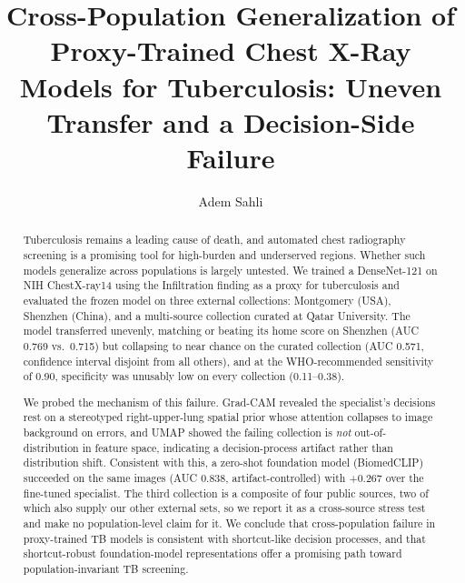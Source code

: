 \documentclass[runningheads]{llncs}
\begin{document}
\title{Cross-Population Generalization of Proxy-Trained Chest X-Ray Models for Tuberculosis: Uneven Transfer and a Decision-Side Failure}

\author{Adem Sahli}

\maketitle

\begin{abstract}
Tuberculosis remains a leading cause of death, and automated chest radiography screening is a promising tool for high-burden and underserved regions. Whether such models generalize across populations is largely untested. We trained a DenseNet-121 on NIH ChestX-ray14 using the Infiltration finding as a proxy for tuberculosis and evaluated the frozen model on three external collections: Montgomery (USA), Shenzhen (China), and a multi-source collection curated at Qatar University. The model transferred unevenly, matching or beating its home score on Shenzhen (AUC 0.769 vs.\ 0.715) but collapsing to near chance on the curated collection (AUC 0.571, confidence interval disjoint from all others), and at the WHO-recommended sensitivity of 0.90, specificity was unusably low on every collection (0.11--0.38).

We probed the mechanism of this failure. Grad-CAM revealed the specialist's decisions rest on a stereotyped right-upper-lung spatial prior whose attention collapses to image background on errors, and UMAP showed the failing collection is \emph{not} out-of-distribution in feature space, indicating a decision-process artifact rather than distribution shift. Consistent with this, a zero-shot foundation model (BiomedCLIP) succeeded on the same images (AUC 0.838, artifact-controlled) with +0.267 over the fine-tuned specialist. The third collection is a composite of four public sources, two of which also supply our other external sets, so we report it as a cross-source stress test and make no population-level claim for it. We conclude that cross-population failure in proxy-trained TB models is consistent with shortcut-like decision processes, and that shortcut-robust foundation-model representations offer a promising path toward population-invariant TB screening.

\end{abstract}
\end{document}
